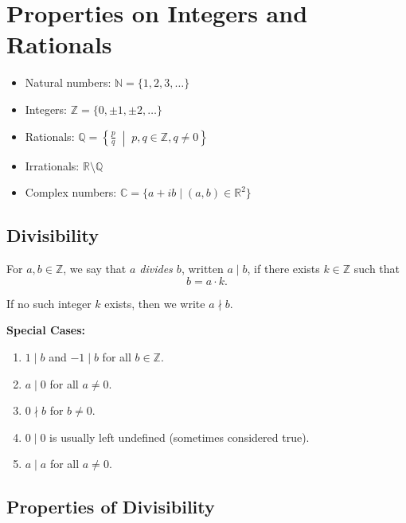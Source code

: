 \section{Properties on Integers and Rationals}

\begin{itemize}[leftmargin=2em]
    \item Natural numbers: \(\mathbb{N} = \{1, 2, 3, \ldots\}\)
    \item Integers: \(\mathbb{Z} = \{0, \pm1, \pm2, \ldots\}\)
    \item Rationals: \(\mathbb{Q} = \left\{ \tfrac{p}{q} \;\middle\vert\; p, q \in \mathbb{Z}, q \neq 0 \right\}\)
    \item Irrationals: \(\mathbb{R} \setminus \mathbb{Q}\)
    \item Complex numbers: \(\mathbb{C} = \{a + ib \mid (a, b) \in \mathbb{R}^2\}\)
\end{itemize}

\subsection{Divisibility}

\begin{definition}[Divisibility]
For $a, b \in \mathbb{Z}$, we say that \emph{$a$ divides $b$}, written $a \mid b$, if there exists $k \in \mathbb{Z}$ such that
\[
b = a \cdot k.
\]
\end{definition}

If no such integer $k$ exists, then we write $a \nmid b$.

\medskip
\textbf{Special Cases:}
\begin{enumerate}[label=(\roman*)]
    \item $1 \mid b$ and $-1 \mid b$ for all $b \in \mathbb{Z}$.  
    \item $a \mid 0$ for all $a \neq 0$.  
    \item $0 \nmid b$ for $b \neq 0$.  
    \item $0 \mid 0$ is usually left undefined (sometimes considered true).  
    \item $a \mid a$ for all $a \neq 0$.  
\end{enumerate}

\subsection{Properties of Divisibility}

